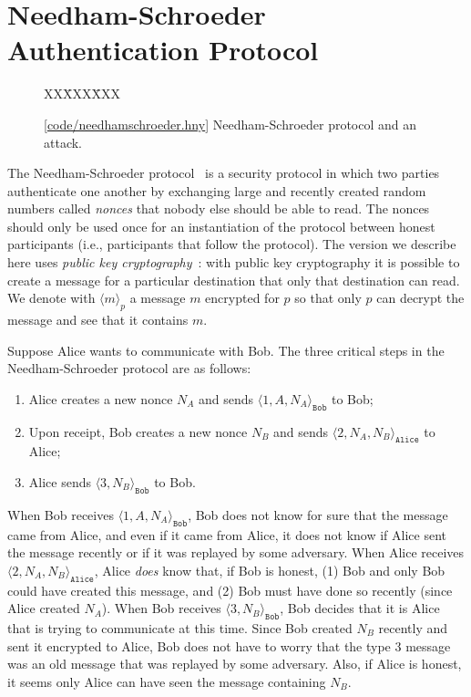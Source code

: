 \documentclass{report}
\newcommand{\harmonysource}[1]{
\begin{tabbing}
XX\=XXX\=XXX\kill
    
\end{tabbing}
}
\newcommand{\harmonylink}[1]{%
[\href{https://harmony.cs.cornell.edu/#1}{\underline{#1}}]%
}
\newenvironment{code}{
\tcolorbox
}{
\endtcolorbox
}
\begin{document}
\chapter{Needham-Schroeder Authentication Protocol}
\label{ch:ns}

\begin{figure}
\begin{code}
\harmonysource{needhamschroeder}
\end{code}
\caption{\harmonylink{code/needhamschroeder.hny} Needham-Schroeder protocol and an attack.}
\label{fig:ns}
\end{figure}

The Needham-Schroeder protocol~\cite{NS78} is a security protocol in which two parties
authenticate one another by exchanging large and recently created random numbers
called \emph{nonces} that nobody else should be able to read.
The nonces should only be used once for an instantiation of the protocol between
honest participants (i.e., participants that follow the protocol).
The version we describe here uses \emph{public key cryptography}~\cite{DH76}: with public key
cryptography it is possible to create a message for a particular destination that
only that destination can read.  We denote with $\langle m \rangle_p$ a message
$m$ encrypted for $p$ so that only $p$ can decrypt the message and see that it contains $m$.

Suppose Alice wants to communicate with Bob.  The three critical steps in the
Needham-Schroeder protocol are as follows:

\begin{enumerate}
\item Alice creates a new nonce $N_A$ and sends $\langle 1, A, N_A \rangle_\mathtt{Bob}$
to Bob;
\item Upon receipt, Bob creates a new nonce $N_B$ and sends
$\langle 2, N_A, N_B \rangle_\mathtt{Alice}$ to Alice;
\item Alice sends $\langle 3, N_B \rangle_\mathtt{Bob}$ to Bob.
\end{enumerate}

When Bob receives $\langle 1, A, N_A \rangle_\mathtt{Bob}$, Bob does not know for sure
that the message came from Alice, and even if it came from Alice, it does not know if
Alice sent the message recently or if it was replayed by some adversary.
When Alice receives $\langle 2, N_A, N_B \rangle_\mathtt{Alice}$, Alice \emph{does}
know that, if Bob is honest, (1) Bob and only Bob could have created this message, and
(2) Bob must have done so recently (since Alice created $N_A$).
When Bob receives $\langle 3, N_B \rangle_\mathtt{Bob}$, Bob decides that it is Alice
that is trying to communicate at this time.  Since Bob created $N_B$ recently and sent it
encrypted to Alice, Bob does not have to worry that the type 3 message was an old message
that was replayed by some adversary.
Also, if Alice is honest, it seems only Alice can have seen the message containing $N_B$.
\end{document}
